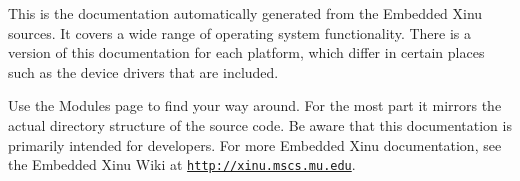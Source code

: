 This is the documentation automatically generated from the Embedded Xinu sources. It covers a wide range of operating system functionality. There is a version of this documentation for each platform, which differ in certain places such as the device drivers that are included.

Use the Modules page to find your way around. For the most part it mirrors the actual directory structure of the source code. Be aware that this documentation is primarily intended for developers. For more Embedded Xinu documentation, see the Embedded Xinu Wiki at \href{http://xinu.mscs.mu.edu}{\tt http\-://xinu.\-mscs.\-mu.\-edu}. 